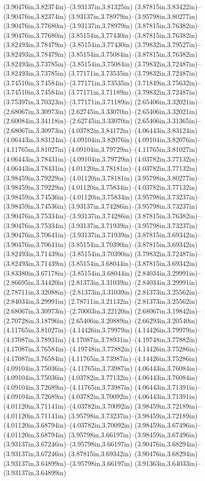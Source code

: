 (3.90476in,3.82374in)--(3.93137in,3.81325in) (3.87815in,3.83422in)--(3.90476in,3.82374in) (3.93137in,3.78979in)--(3.95798in,3.80277in) (3.90476in,3.77680in)--(3.93137in,3.78979in) (3.87815in,3.76382in)--(3.90476in,3.77680in) (3.85154in,3.77430in)--(3.87815in,3.76382in) (3.82493in,3.78479in)--(3.85154in,3.77430in) (3.79832in,3.79527in)--(3.82493in,3.78479in) (3.85154in,3.75084in)--(3.87815in,3.76382in) (3.82493in,3.73785in)--(3.85154in,3.75084in) (3.79832in,3.72487in)--(3.82493in,3.73785in) (3.77171in,3.73535in)--(3.79832in,3.72487in) (3.74510in,3.74584in)--(3.77171in,3.73535in) (3.71849in,3.75632in)--(3.74510in,3.74584in) (3.77171in,3.71189in)--(3.79832in,3.72487in) (3.75397in,3.70323in)--(3.77171in,3.71189in) (2.65406in,3.32021in)--(2.68067in,3.30973in) (2.62745in,3.33070in)--(2.65406in,3.32021in) (2.60084in,3.34118in)--(2.62745in,3.33070in) (2.65406in,3.31365in)--(2.68067in,3.30973in) (4.03782in,3.84172in)--(4.06443in,3.83124in) (4.06443in,3.83124in)--(4.09104in,3.82076in) (4.09104in,3.82076in)--(4.11765in,3.81027in) (4.09104in,3.79729in)--(4.11765in,3.81027in) (4.06443in,3.78431in)--(4.09104in,3.79729in) (4.03782in,3.77132in)--(4.06443in,3.78431in) (4.01120in,3.78181in)--(4.03782in,3.77132in) (3.98459in,3.79229in)--(4.01120in,3.78181in) (3.95798in,3.80277in)--(3.98459in,3.79229in) (4.01120in,3.75834in)--(4.03782in,3.77132in) (3.98459in,3.74536in)--(4.01120in,3.75834in) (3.95798in,3.73237in)--(3.98459in,3.74536in) (3.93137in,3.74286in)--(3.95798in,3.73237in) (3.90476in,3.75334in)--(3.93137in,3.74286in) (3.87815in,3.76382in)--(3.90476in,3.75334in) (3.93137in,3.71939in)--(3.95798in,3.73237in) (3.90476in,3.70641in)--(3.93137in,3.71939in) (3.87815in,3.69342in)--(3.90476in,3.70641in) (3.85154in,3.70390in)--(3.87815in,3.69342in) (3.82493in,3.71439in)--(3.85154in,3.70390in) (3.79832in,3.72487in)--(3.82493in,3.71439in) (3.85154in,3.68044in)--(3.87815in,3.69342in) (3.83380in,3.67178in)--(3.85154in,3.68044in) (2.84034in,3.29991in)--(2.86695in,3.34420in) (2.81373in,3.31039in)--(2.84034in,3.29991in) (2.78711in,3.32088in)--(2.81373in,3.31039in) (2.81373in,3.25562in)--(2.84034in,3.29991in) (2.78711in,3.21132in)--(2.81373in,3.25562in) (2.68067in,3.30973in)--(2.70003in,3.22120in) (2.68067in,3.19842in)--(2.70728in,3.18796in) (2.65406in,3.20889in)--(2.66293in,3.20540in) (4.11765in,3.81027in)--(4.14426in,3.79979in) (4.14426in,3.79979in)--(4.17087in,3.78931in) (4.17087in,3.78931in)--(4.19748in,3.77882in) (4.17087in,3.76584in)--(4.19748in,3.77882in) (4.14426in,3.75286in)--(4.17087in,3.76584in) (4.11765in,3.73987in)--(4.14426in,3.75286in) (4.09104in,3.75036in)--(4.11765in,3.73987in) (4.06443in,3.76084in)--(4.09104in,3.75036in) (4.03782in,3.77132in)--(4.06443in,3.76084in) (4.09104in,3.72689in)--(4.11765in,3.73987in) (4.06443in,3.71391in)--(4.09104in,3.72689in) (4.03782in,3.70092in)--(4.06443in,3.71391in) (4.01120in,3.71141in)--(4.03782in,3.70092in) (3.98459in,3.72189in)--(4.01120in,3.71141in) (3.95798in,3.73237in)--(3.98459in,3.72189in) (4.01120in,3.68794in)--(4.03782in,3.70092in) (3.98459in,3.67496in)--(4.01120in,3.68794in) (3.95798in,3.66197in)--(3.98459in,3.67496in) (3.93137in,3.67246in)--(3.95798in,3.66197in) (3.90476in,3.68294in)--(3.93137in,3.67246in) (3.87815in,3.69342in)--(3.90476in,3.68294in) (3.93137in,3.64899in)--(3.95798in,3.66197in) (3.91363in,3.64033in)--(3.93137in,3.64899in) 